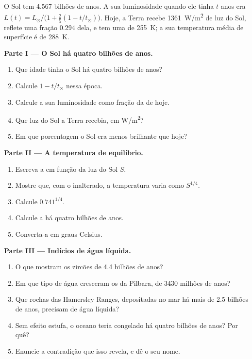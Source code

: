 \begin{problem}
\label{pb:g12:early-earth:1}
O Sol tem \num{4.567} bilhões de anos. A sua luminosidade quando ele tinha $t$
anos era $L(t) = L_\odot/\bigl(1 + \tfrac25 (1 - t/t_\odot)\bigr)$. Hoje,
a Terra recebe \qty{1361}{W/m^2} de luz do Sol, reflete uma fração 0.294
dela, e tem uma  de \qty{255}{K}; a sua temperatura
média de superfície é de \qty{288}{K}.

\medskip
\noindent\textbf{Parte I --- O Sol há quatro bilhões de anos.}
\begin{enumerate}
  \item Que idade tinha o Sol há quatro bilhões de anos?
  \item Calcule $1 - t/t_\odot$ nessa época.
  \item Calcule a sua luminosidade como fração da de hoje.
  \item Que luz do Sol a Terra recebia, em \unit{W/m^2}?
  \item Em que porcentagem o Sol era menos brilhante que hoje?
\end{enumerate}

\medskip
\noindent\textbf{Parte II --- A temperatura de equilíbrio.}
\begin{enumerate}[resume]
  \item Escreva a  em função da luz do Sol $S$.
  \item Mostre que, com o  inalterado, a temperatura varia como
        $S^{1/4}$.
  \item Calcule $0.741^{1/4}$.
  \item Calcule a  há quatro bilhões de anos.
  \item Converta-a em graus Celsius.
\end{enumerate}

\medskip
\noindent\textbf{Parte III --- Indícios de água líquida.}
\begin{enumerate}[resume]
  \item O que mostram os zircões de 4.4 bilhões de anos?
  \item Em que tipo de água cresceram os  da Pilbara, de
        \num{3430} milhões de anos?
  \item Que rochas das Hamersley Ranges, depositadas no mar há mais de
        2.5 bilhões de anos, precisam de água líquida?
  \item Sem efeito estufa, o oceano teria congelado há quatro bilhões de
        anos? Por quê?
  \item Enuncie a contradição que isso revela, e dê o seu nome.
\end{enumerate}


\end{problem}
